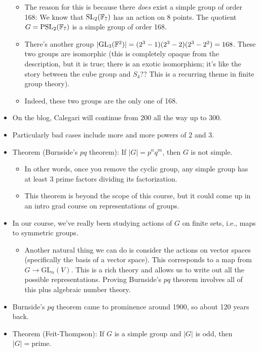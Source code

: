 \documentclass[../notes.tex]{subfiles}
\begin{document}
\begin{itemize}
\begin{itemize}
        \item The reason for this is because there \emph{does} exist a simple group of order 168: We know that $\text{SL}_2(\mathbb{F}_7)$ has an action on 8 points. The quotient $G=\text{PSL}_2(\mathbb{F}_7)$ is a simple group of order 168.
        \item There's another group $|\text{GL}_3(\mathbb{F}^2)|=(2^3-1)(2^3-2)(2^3-2^2)=168$. These two groups are isomorphic (this is completely opaque from the description, but it is true; there is an exotic isomorphism; it's like the story between the cube group and $S_4$?? This is a recurring theme in finite group theory).
        \item Indeed, these two groups are the only one of 168.
    \end{itemize}
    \item On the blog, Calegari will continue from 200 all the way up to 300.
    \item Particularly bad cases include more and more powers of 2 and 3.
    \item Theorem (Burnside's $pq$ theorem): If $|G|=p^nq^m$, then $G$ is not simple.
    \begin{itemize}
        \item In other words, once you remove the cyclic group, any simple group has at least 3 prime factors dividing its factorization.
        \item This theorem is beyond the scope of this course, but it could come up in an intro grad course on representations of groups.
    \end{itemize}
    \item In our course, we've really been studying actions of $G$ on finite sets, i.e., maps to symmetric groups.
    \begin{itemize}
        \item Another natural thing we can do is consider the actions on vector spaces (specifically the basis of a vector space). This corresponds to a map from $G\to\text{GL}_n(V)$. This is a rich theory and allows us to write out all the possible representations. Proving Burnside's $pq$ theorem involves all of this plus algebraic number theory.
    \end{itemize}
    \item Burnside's $pq$ theorem came to prominence around 1900, so about 120 years back.
    \item Theorem (Feit-Thompson): If $G$ is a simple group and $|G|$ is odd, then $|G|=\text{prime}$.
    \begin{itemize}

\end{itemize}
\end{itemize}
\end{document}
